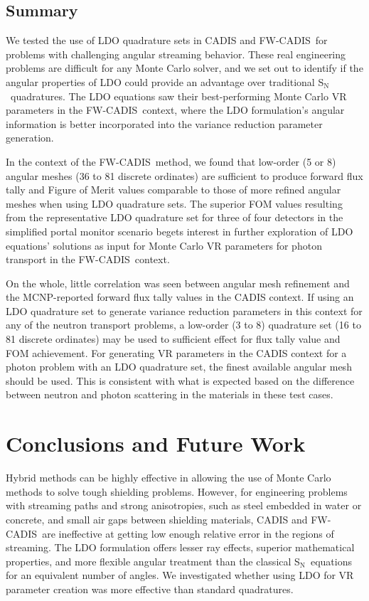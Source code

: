 \documentclass{article} %
\newcommand{\sn}{S$_\mathrm{N}$}
\newcommand{\fwc}{\mbox{FW-CADIS}}
\begin{document}
\subsection{Summary}

We tested the use of LDO quadrature sets in CADIS and \fwc\ for problems with challenging angular streaming behavior. These real engineering problems are difficult for any Monte Carlo solver, and we set out to identify if the angular properties of LDO could provide an advantage over traditional \sn\ quadratures. The LDO equations saw their best-performing Monte Carlo VR parameters in the
\fwc\ context, where the LDO formulation's angular information is better
incorporated into the variance reduction parameter generation.

In the context of the \fwc\ method, we found that low-order (5 or 8) angular
meshes (36 to 81 discrete ordinates) are sufficient to produce forward flux
tally and Figure of Merit values comparable to those of more refined angular
meshes when using LDO quadrature sets. The superior FOM values resulting from
the representative LDO quadrature set for three of four detectors in the
simplified portal monitor scenario begets interest in further exploration of
LDO equations' solutions as input for Monte Carlo VR parameters for photon
transport in the \fwc\ context.

On the whole, little correlation was seen between angular mesh refinement and
the MCNP-reported forward flux tally values in the CADIS context. If using an
LDO quadrature set to generate variance reduction parameters in this context
for any of the neutron transport problems, a low-order (3 to 8) quadrature
set (16 to 81 discrete ordinates) may be used to sufficient effect for flux
tally value and FOM achievement. For generating VR parameters in the CADIS
context for a photon problem with an LDO quadrature set, the finest available
angular mesh should be used. This is consistent with what is expected based on
the difference between neutron and photon scattering in the materials in these
test cases.

\section{Conclusions and Future Work}
\label{sec:conclusions}

Hybrid methods can be highly effective in allowing the use of Monte Carlo
methods to solve tough shielding problems. However, for engineering problems
with streaming paths and strong anisotropies, such as steel embedded in water or
concrete, and small air gaps between shielding materials, CADIS and \fwc\ are
ineffective at getting low enough relative error in the regions of streaming.
The LDO formulation offers lesser ray effects, superior mathematical properties,
and more flexible angular treatment than the classical \sn\ equations for an
equivalent number of angles. We investigated whether using LDO for VR parameter
creation was more effective than standard quadratures.
\end{document}
